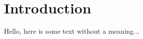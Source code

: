 \documentclass[../main.tex]{subfiles}
\begin{document}
\section{Introduction}

Hello, here is some text without a meaning...
\end{document}
